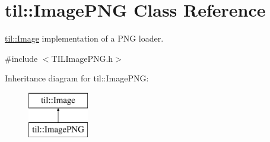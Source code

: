 \hypertarget{classtil_1_1_image_p_n_g}{
\section{til::ImagePNG Class Reference}
\label{classtil_1_1_image_p_n_g}
}


\hyperlink{classtil_1_1_image}{til::Image} implementation of a PNG loader.  




{\ttfamily \#include $<$TILImagePNG.h$>$}

Inheritance diagram for til::ImagePNG:\begin{figure}[H]
\begin{center}
\leavevmode
\includegraphics[height=2.000000cm]{classtil_1_1_image_p_n_g}
\end{center}
\end{figure}
